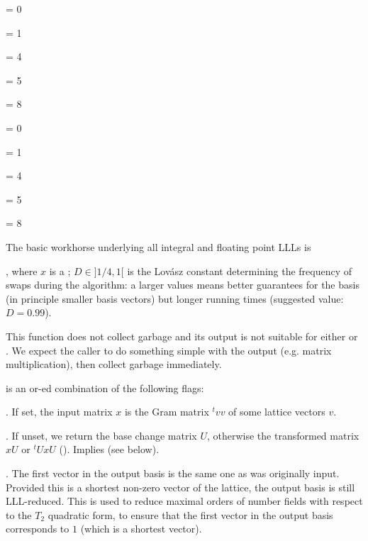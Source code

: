 \item {}

 \fl = 0

 \fl = 1

 \fl = 4

 \fl = 5

 \fl = 8

\item {}

 \fl = 0

 \fl = 1

 \fl = 4

 \fl = 5

 \fl = 8

\smallskip

The basic workhorse underlying all integral and floating point LLLs is

, where $x$ is a ;
$D \in ]1/4,1[$ is the Lov\'{a}sz constant determining the frequency of
swaps during the algorithm: a larger values means better guarantees for
the basis (in principle smaller basis vectors) but longer running times
(suggested value: $D = 0.99$).

 This function does not collect garbage and its output
is not suitable for either  or . We expect
the caller to do something simple with the output (e.g. matrix
multiplication), then collect garbage immediately.

\noindent{} is an or-ed combination of the following flags:

\item  {}. If set, the input matrix $x$ is the Gram matrix ${}^t
v v$ of some lattice vectors $v$.

\item  {}. If unset, we return the base change matrix $U$,
otherwise the transformed matrix $x U$ or ${}^t U x U$ ().
Implies  (see below).

\item  {}. The first vector in the output basis is the same
one as was originally input. Provided this is a shortest non-zero vector of
the lattice, the output basis is still LLL-reduced. This is used to reduce
maximal orders of number fields with respect to the $T_2$ quadratic form, to
ensure that the first vector in the output basis corresponds to $1$ (which is
a shortest vector).

